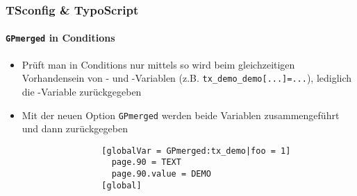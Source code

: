 
\begin{frame}[fragile]
	\frametitle{TSconfig \& TypoScript}
	\framesubtitle{\texttt{GPmerged} in Conditions}

	\begin{itemize}

		\item Prüft man in Conditions nur mittels  so wird beim
			gleichzeitigen Vorhandensein von - und -Variablen
			(z.B. \texttt{tx\_demo\_demo[...]=...}), lediglich die
			-Variable zurückgegeben

		\item Mit der neuen Option \texttt{GPmerged} werden beide Variablen
			zusammengeführt und dann zurückgegeben

			\begin{lstlisting}
				[globalVar = GPmerged:tx_demo|foo = 1]
				  page.90 = TEXT
				  page.90.value = DEMO
				[global]
			\end{lstlisting}

	\end{itemize}

\end{frame}


